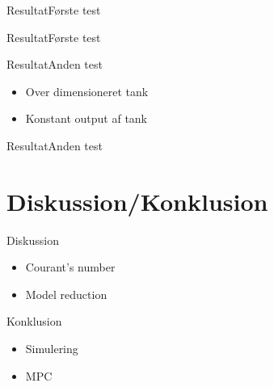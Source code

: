 \begin{frame}{Resultat}{Første test}
 \begin{figure}[H]
\centering

\label{fig:Simulering_output_first}
\end{figure}     
\end{frame}

\begin{frame}{Resultat}{Første test}
\begin{figure}[H]
\centering

\label{fig:Simulering_output_first_concentration}
\end{figure}    
\end{frame}

\begin{frame}{Resultat}{Anden test}
    \vfill \vfill \centering
\begin{itemize}
	\item Over dimensioneret tank
	\item Konstant output af tank
\end{itemize}
\vfill \vfill
\end{frame}


\begin{frame}{Resultat}{Anden test}
\begin{figure}[H]
\centering

\label{fig:Simulering_output_second}
\end{figure} 
\end{frame}


\section{Diskussion/Konklusion}
\begin{frame}{Diskussion}{}
\vfill \vfill \centering
\begin{itemize}
	\item Courant's number
	\item Model reduction
\end{itemize}
\vfill \vfill
\end{frame}


\begin{frame}{Konklusion}{}
\vfill \vfill\centering
\begin{itemize}
    	\item Simulering
    	\item MPC
\end{itemize}    

\vfill \vfill
\end{frame}
